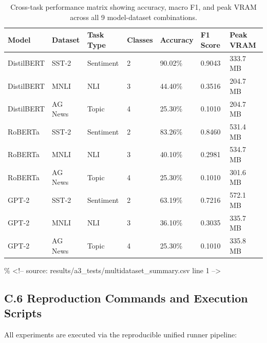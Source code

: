 \begin{table}[H]
\centering
\small
\begin{tabular}{lllllll}
\toprule
\textbf{Model} & \textbf{Dataset} & \textbf{Task Type} & \textbf{Classes} & \textbf{Accuracy} & \textbf{F1 Score} & \textbf{Peak VRAM} \\
\midrule
DistilBERT & SST-2    & Sentiment & 2 & 90.02\% & 0.9043 & 333.7 MB \\
DistilBERT & MNLI     & NLI       & 3 & 44.40\% & 0.3516 & 204.7 MB \\
DistilBERT & AG News  & Topic     & 4 & 25.30\% & 0.1010 & 204.7 MB \\
RoBERTa    & SST-2    & Sentiment & 2 & 83.26\% & 0.8460 & 531.4 MB \\
RoBERTa    & MNLI     & NLI       & 3 & 40.10\% & 0.2981 & 534.7 MB \\
RoBERTa    & AG News  & Topic     & 4 & 25.30\% & 0.1010 & 301.6 MB \\
GPT-2      & SST-2    & Sentiment & 2 & 63.19\% & 0.7216 & 572.1 MB \\
GPT-2      & MNLI     & NLI       & 3 & 36.10\% & 0.3035 & 335.7 MB \\
GPT-2      & AG News  & Topic     & 4 & 25.30\% & 0.1010 & 335.8 MB \\
\bottomrule
\end{tabular}
\caption{Cross-task performance matrix showing accuracy, macro F1, and peak VRAM across all 9 model-dataset combinations.}
\label{tab:c_multitask_matrix}
\end{table}
\% \textless{}!-- source: results/a3\_tests/multidataset\_summary.csv line 1 --\textgreater{}

\subsection{C.6 Reproduction Commands and Execution Scripts}
\label{sec:app_reproduction}

All experiments are executed via the reproducible unified runner pipeline:

